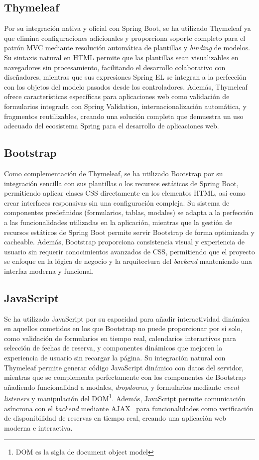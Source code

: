 \subsection{Thymeleaf}\label{thymeleaf}
Por su integración nativa y oficial con Spring Boot, se ha utilizado Thymeleaf ya que elimina configuraciones adicionales y proporciona soporte completo para el patrón MVC mediante resolución automática de plantillas y \emph{binding} de modelos. Su sintaxis natural en HTML permite que las plantillas sean visualizables en navegadores sin procesamiento, facilitando el desarrollo colaborativo con diseñadores, mientras que sus expresiones Spring EL se integran a la perfección con los objetos del modelo pasados desde los controladores. Además, Thymeleaf ofrece características específicas para aplicaciones web como validación de formularios integrada con Spring Validation, internacionalización automática, y fragmentos reutilizables, creando una solución completa que demuestra un uso adecuado del ecosistema Spring para el desarrollo de aplicaciones web.

\subsection{Bootstrap}\label{bootstrap}
Como complementación de Thymeleaf, se ha utilizado Bootstrap por su integración sencilla con sus plantillas o los recursos estáticos de Spring Boot, permitiendo aplicar clases CSS directamente en los elementos HTML, así como crear interfaces responsivas sin una configuración compleja. Su sistema de componentes predefinidos (formularios, tablas, modales) se adapta a la perfección a las funcionalidades utilizadas en la aplicación, mientras que la gestión de recursos estáticos de Spring Boot permite servir Bootstrap de forma optimizada y cacheable. Además, Bootstrap proporciona consistencia visual y experiencia de usuario sin requerir conocimientos avanzados de CSS, permitiendo que el proyecto se enfoque en la lógica de negocio y la arquitectura del \emph{backend} manteniendo una interfaz moderna y funcional.

\subsection{JavaScript}\label{javascript}
Se ha utilizado JavaScript por su capacidad para añadir interactividad dinámica en aquellos cometidos en los que Bootstrap no puede proporcionar por sí solo, como validación de formularios en tiempo real, calendarios interactivos para selección de fechas de reserva, y componentes dinámicos que mejoren la experiencia de usuario sin recargar la página. Su integración natural con Thymeleaf permite generar código JavaScript dinámico con datos del servidor, mientras que se complementa perfectamente con los componentes de Bootstrap añadiendo funcionalidad a modales, \emph{dropdowns}, y formularios mediante \emph{event listeners} y manipulación del DOM\footnote{DOM es la sigla de document object model}. Además, JavaScript permite comunicación asíncrona con el \emph{backend} mediante AJAX~\cite{ajax} para funcionalidades como verificación de disponibilidad de reservas en tiempo real, creando una aplicación web moderna e interactiva.

